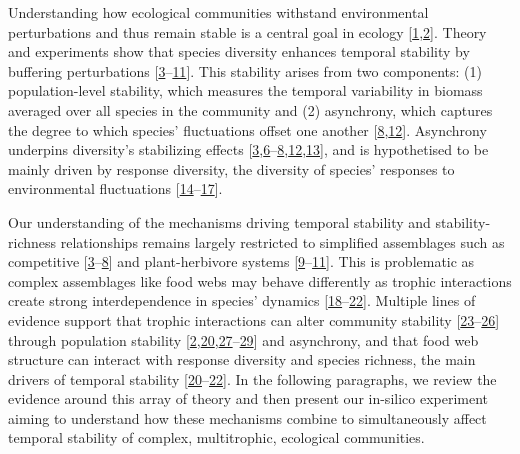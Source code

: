 \documentclass[
]{article}
\begin{document}
Understanding how ecological communities withstand environmental perturbations
and thus remain stable is a central goal in ecology {[}\protect\hyperlink{ref-macarthur_fluctuations_1955}{1},\protect\hyperlink{ref-may_will_1972}{2}{]}. Theory and experiments show that species diversity enhances
temporal stability by buffering perturbations {[}\protect\hyperlink{ref-yachi_biodiversity_1999}{3}--\protect\hyperlink{ref-thebault_stability_2010}{11}{]}. This stability arises from two components: (1)
population-level stability, which measures the temporal variability in biomass
averaged over all species in the community and (2) asynchrony, which captures the
degree to which species' fluctuations offset one another
{[}\protect\hyperlink{ref-zhao_biodiversity_2022}{8},\protect\hyperlink{ref-thibaut_understanding_2013}{12}{]}. Asynchrony underpins
diversity's stabilizing effects {[}\protect\hyperlink{ref-yachi_biodiversity_1999}{3},\protect\hyperlink{ref-de_mazancourt_predicting_2013}{6}--\protect\hyperlink{ref-zhao_biodiversity_2022}{8},\protect\hyperlink{ref-thibaut_understanding_2013}{12},\protect\hyperlink{ref-olivier_urbanization_2020}{13}{]}, and is
hypothetised to be mainly driven by response diversity, the diversity of
species' responses to environmental fluctuations {[}\protect\hyperlink{ref-elmqvist_response_2003}{14}--\protect\hyperlink{ref-polazzo_measuring_2024}{17}{]}.

Our understanding of the mechanisms driving temporal stability and
stability-richness relationships remains largely restricted to simplified
assemblages such as competitive {[}\protect\hyperlink{ref-yachi_biodiversity_1999}{3}--\protect\hyperlink{ref-zhao_biodiversity_2022}{8}{]} and plant-herbivore systems
{[}\protect\hyperlink{ref-downing_ecosystem_2002}{9}--\protect\hyperlink{ref-thebault_stability_2010}{11}{]}. This is problematic as complex assemblages like food
webs may behave differently as trophic interactions create strong
interdependence in species' dynamics {[}\protect\hyperlink{ref-raimondo_interspecific_2004}{18}--\protect\hyperlink{ref-fahimipour_compensation_2017}{22}{]}. Multiple lines of evidence support that trophic
interactions can alter community stability {[}\protect\hyperlink{ref-brose_allometric_2006}{23}--\protect\hyperlink{ref-eschenbrenner_diversity_2023}{26}{]}
through population stability {[}\protect\hyperlink{ref-may_will_1972}{2},\protect\hyperlink{ref-mccann_weak_1998}{20},\protect\hyperlink{ref-mccann_reevaluating_1997}{27}--\protect\hyperlink{ref-thebault_trophic_2005}{29}{]} and
asynchrony, and that food web structure can interact with response diversity
and species richness, the main drivers of temporal stability
{[}\protect\hyperlink{ref-mccann_weak_1998}{20}--\protect\hyperlink{ref-fahimipour_compensation_2017}{22}{]}. In the following paragraphs, we review the
evidence around this array of theory and then present our in-silico experiment
aiming to understand how these mechanisms combine to simultaneously affect
temporal stability of complex, multitrophic, ecological communities.
\end{document}
